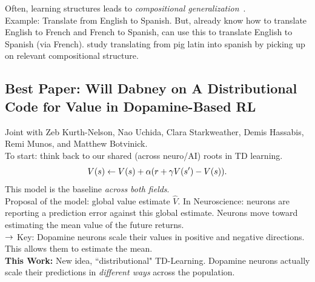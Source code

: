 Often, learning structures leads to {\it compositional generalization}~\cite{chang2018automatically}.\\ 

Example: Translate from English to Spanish. But, already know how to translate English to French and French to Spanish, can use this to translate English to Spanish (via French). \citet{chang2018automatically} study translating from pig latin into spanish by picking up on relevant compositional structure. \\



\spacerule

\subsection{Best Paper: Will Dabney on  A Distributional Code for Value in
Dopamine-Based RL}
\label{sec:will-neuro}

Joint with Zeb Kurth-Nelson, Nao Uchida, Clara Starkweather, Demis Hassabis, Remi Munos, and Matthew Botvinick. \\

To start: think back to our shared (across neuro/AI) roots in TD learning.
\[
V(s) \leftarrow V(s) + \alpha(r + \gamma V(s') - V(s)).
\]
This model is the baseline {\it across both fields}. \\

Proposal of the model: global value estimate $\hat{V}$. In Neuroscience: neurons are reporting a prediction error against this global estimate. Neurons move toward estimating the mean value of the future returns. \\
    
    $\rightarrow$ Key: Dopamine neurons scale their values in positive and negative directions. This allows them to estimate the mean. \\


{\bf This Work:} New idea, ``distributional" TD-Learning. Dopamine neurons actually scale their predictions in {\it different ways} across the population. \\


